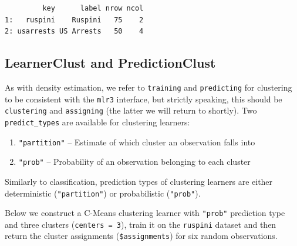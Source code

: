 \begin{Shaded}
\begin{Highlighting}[]
\NormalTok{(mlr\_tasks)[task\_type }\SpecialCharTok{==} \NormalTok{, }\NormalTok{(}\SpecialCharTok{:}\NormalTok{, }\SpecialCharTok{:}\NormalTok{)]}
\end{Highlighting}
\end{Shaded}

\begin{verbatim}
         key      label nrow ncol
1:   ruspini    Ruspini   75    2
2: usarrests US Arrests   50    4
\end{verbatim}

\hypertarget{learnerclust-and-predictionclust}{%
\subsection{LearnerClust and
PredictionClust}\label{learnerclust-and-predictionclust}}

As with density estimation, we refer to \texttt{training} and
\texttt{predicting} for clustering to be consistent with the
\texttt{mlr3} interface, but strictly speaking, this should be
\texttt{clustering} and \texttt{assigning} (the latter we will return to
shortly). Two \texttt{predict\_types} are available for clustering
learners:

\begin{enumerate}
\def\labelenumi{\arabic{enumi}.}
\tightlist
\item
  \texttt{"partition"} -- Estimate of which cluster an observation falls
  into
\item
  \texttt{"prob"} -- Probability of an observation belonging to each
  cluster
\end{enumerate}

Similarly to classification, prediction types of clustering learners are
either deterministic (\texttt{"partition"}) or probabilistic
(\texttt{"prob"}).

Below we construct a C-Means clustering learner with \texttt{"prob"}
prediction type and three clusters (\texttt{centers\ =\ 3}), train it on
the \texttt{ruspini} dataset and then return the cluster assignments
(\texttt{\$assignments}) for six random observations.

\begin{Shaded}
\begin{Highlighting}[]
\OtherTok{=} \NormalTok{(}\NormalTok{, } \NormalTok{, } \NormalTok{)}
\end{Highlighting}
\end{Shaded}

